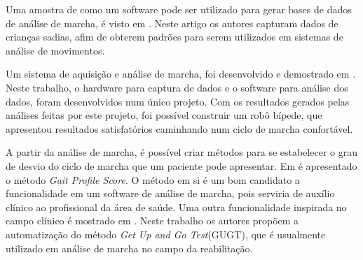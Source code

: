 Uma amostra de como um software pode ser utilizado para gerar bases de dados de análise de marcha, é visto em \cite{Moreno2009}. Neste artigo os autores capturam dados de crianças sadias, afim de obterem padrões para serem utilizados em sistemas de análise de movimentos.

Um sistema de aquisição e análise de marcha, foi desenvolvido e demostrado em \cite{Ferreira2009}. 
Neste trabalho, o hardware para captura de dados e o software para análise dos dados, foram desenvolvidos num único projeto.
Com os resultados gerados pelas análises feitas por este projeto, foi possível construir um robô bípede, que apresentou resultados satisfatórios caminhando num ciclo de marcha confortável.

A partir da análise de marcha, é possível criar métodos para se estabelecer o grau de desvio do ciclo de marcha que um paciente pode apresentar.
Em \cite{Beynon2010} é apresentado o método \emph{Gait Profile Score}.
O método em si é um bom candidato a funcionalidade em um software de análise de marcha, pois serviria de auxílio clínico ao profissional da área de saúde.
Uma outra funcionalidade inspirada no campo clínico é mostrado em \cite{Cippitelli2015}. Neste trabalho os autores 
propõem a automatização do método \emph{Get Up and Go Test}(GUGT), que é usualmente utilizado em análise de marcha no campo da reabilitação.


 
